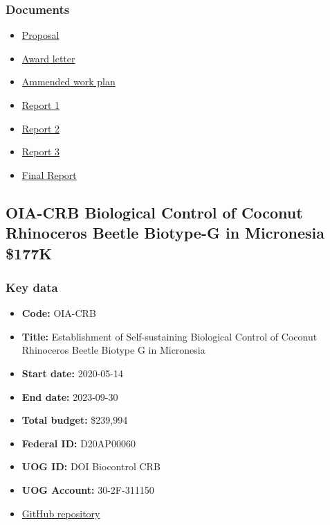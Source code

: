 \subsubsection{Documents}
\begin{itemize}
	\setlength\itemsep{0em}	
	\item \href{https://github.com/aubreymoore/Miscellaneous-Docs-for-CFES2018/raw/master/MooreFB19.pdf}{Proposal}		
	\item \href{https://github.com/aubreymoore/FY2018-Farm-Bill-Suggestion/blob/master/from\%20EFG/Award\%20Document.pdf}{Award letter}			
	\item \href{https://github.com/aubreymoore/FY2018-Farm-Bill-Suggestion/raw/master/extension-request/MooreFB19WorkPlan-ammended.pdf}{Ammended work plan}		
	\item \href{https://github.com/aubreymoore/FY19-PPA-Report-1/raw/master/PPA19-report-1.pdf}{Report 1}	
	\item \href{https://github.com/aubreymoore/FY19-PPA-Report-1/raw/master/PPA19-report2.pdf}{Report 2}		
	\item \href{https://github.com/aubreymoore/CRB-PPA19-Report3/blob/main/PPA19-report3.pdf}{Report 3}		
	\item \href{}{Final Report}
\end{itemize}




\clearpage
\subsection{OIA-CRB Biological Control of Coconut Rhinoceros Beetle Biotype-G in Micronesia \$177K}
\label{OIA-CRB}

\subsubsection{Key data}
\begin{itemize}
	\setlength\itemsep{0em}	
	\item \textbf{Code:} OIA-CRB
	\item \textbf{Title:} Establishment of Self-sustaining Biological Control of Coconut Rhinoceros Beetle Biotype G in Micronesia
	\item \textbf{Start date:} 2020-05-14
	\item \textbf{End date:} 2023-09-30
	\item \textbf{Total budget:} \$239,994
	\item \textbf{Federal ID:} D20AP00060
	\item \textbf{UOG ID:} DOI Biocontrol CRB
	\item \textbf{UOG Account:} 30-2F-311150
	\item \href{https://github.com/aubreymoore/2020-DOI-CRB-Biocontrol}{GitHub repository}
\end{itemize}

